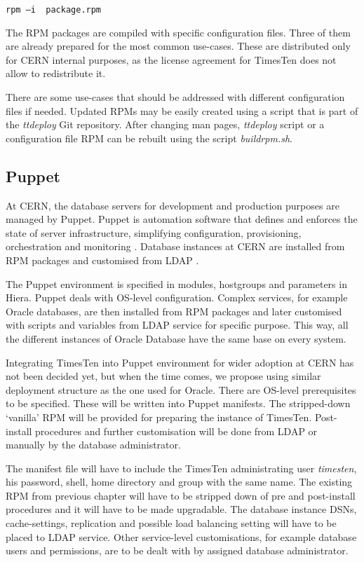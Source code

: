 \documentclass[11pt, letterpaper]{article}
\begin{document}
\begin{lstlisting}
rpm –i  package.rpm
\end{lstlisting}

The RPM packages are compiled with specific configuration files. Three of them are already prepared for the most common use-cases. These are distributed only for CERN internal purposes, as the license agreement for TimesTen does not allow to redistribute it.

There are some use-cases that should be addressed with different configuration files if needed. Updated RPMs may be easily created using a script that is part of the \emph{ttdeploy} Git repository. After changing man pages, \emph{ttdeploy} script or a configuration file RPM can be rebuilt using the script \emph{buildrpm.sh}.

\subsection{Puppet}

At CERN, the database servers for development and production purposes are managed by Puppet. Puppet is automation software that defines and enforces the state of server infrastructure, simplifying configuration, provisioning, orchestration and monitoring \cite{pupref}. Database instances at CERN are installed from RPM packages and customised from LDAP .

The Puppet environment is specified in modules, hostgroups and parameters in Hiera. Puppet deals with OS-level configuration. Complex services, for example Oracle databases, are then installed from RPM packages and later customised with scripts and variables from LDAP service for specific purpose. This way, all the different instances of Oracle Database have the same base on every system.

Integrating TimesTen into Puppet environment for wider adoption at CERN has not been decided yet, but when the time comes, we propose using similar deployment structure as the one used for Oracle. There are OS-level prerequisites to be specified. These will be written into Puppet manifests. The stripped-down ‘vanilla’ RPM will be provided for preparing the instance of TimesTen. Post-install procedures and further customisation will be done from LDAP or manually by the database administrator.

The manifest file will have to include the TimesTen administrating user \emph{timesten}, his password, shell, home directory and group with the same name. The existing RPM from previous chapter will have to be stripped down of pre and post-install procedures and it will have to be made upgradable. The database instance DSNs, cache-settings, replication and possible load balancing setting will have to be placed to LDAP service. Other service-level customisations, for example database users and permissions, are to be dealt with by assigned database administrator.
\end{document}
